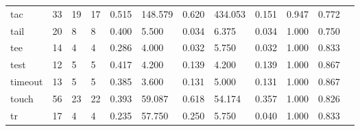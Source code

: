 \begin{longtable}{lp{1.00cm}p{1.00cm}p{1.00cm}p{1.00cm}p{1.00cm}p{1.00cm}p{1.00cm}p{1.00cm}p{1.00cm}p{1.00cm}p{1.00cm}}
tac       &                           33 &                 19 &                                17 &                                      0.515 &                                148.579 &                                        0.620 &                           434.053 &                                   0.151 &                        0.947 &                                        0.772 \\
tail      &                           20 &                  8 &                                 8 &                                      0.400 &                                  5.500 &                                        0.034 &                             6.375 &                                   0.034 &                        1.000 &                                        0.750 \\
tee       &                           14 &                  4 &                                 4 &                                      0.286 &                                  4.000 &                                        0.032 &                             5.750 &                                   0.032 &                        1.000 &                                        0.833 \\
test      &                           12 &                  5 &                                 5 &                                      0.417 &                                  4.200 &                                        0.139 &                             4.200 &                                   0.139 &                        1.000 &                                        0.867 \\
timeout   &                           13 &                  5 &                                 5 &                                      0.385 &                                  3.600 &                                        0.131 &                             5.000 &                                   0.131 &                        1.000 &                                        0.867 \\
touch     &                           56 &                 23 &                                22 &                                      0.393 &                                 59.087 &                                        0.618 &                            54.174 &                                   0.357 &                        1.000 &                                        0.826 \\
tr        &                           17 &                  4 &                                 4 &                                      0.235 &                                 57.750 &                                        0.250 &                             5.750 &                                   0.040 &                        1.000 &                                        0.833 \\

\end{longtable}
